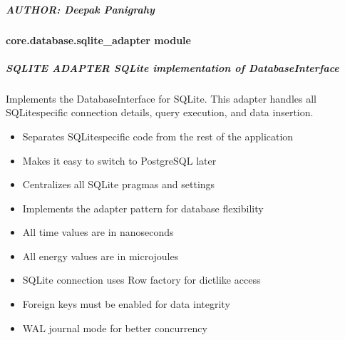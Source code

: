 \documentclass[letterpaper,10pt,english]{sphinxmanual}
\begin{document}
\subparagraph{AUTHOR: Deepak Panigrahy}
\label{\detokenize{core.database.schema:author-deepak-panigrahy}}
\sphinxstepscope


\paragraph{core.database.sqlite\_adapter module}
\label{\detokenize{core.database.sqlite_adapter:module-core.database.sqlite_adapter}}\label{\detokenize{core.database.sqlite_adapter:core-database-sqlite-adapter-module}}\label{\detokenize{core.database.sqlite_adapter::doc}}

\subparagraph{SQLITE ADAPTER \textendash{} SQLite implementation of DatabaseInterface}
\label{\detokenize{core.database.sqlite_adapter:sqlite-adapter-sqlite-implementation-of-databaseinterface}}\begin{description}
\sphinxAtStartPar
Implements the DatabaseInterface for SQLite. This adapter handles all
SQLite\sphinxhyphen{}specific connection details, query execution, and data insertion.

\begin{itemize}
\item {} 
\sphinxAtStartPar
Separates SQLite\sphinxhyphen{}specific code from the rest of the application

\item {} 
\sphinxAtStartPar
Makes it easy to switch to PostgreSQL later

\item {} 
\sphinxAtStartPar
Centralizes all SQLite pragmas and settings

\item {} 
\sphinxAtStartPar
Implements the adapter pattern for database flexibility

\end{itemize}

\begin{itemize}
\item {} 
\sphinxAtStartPar
All time values are in nanoseconds

\item {} 
\sphinxAtStartPar
All energy values are in microjoules

\item {} 
\sphinxAtStartPar
SQLite connection uses Row factory for dict\sphinxhyphen{}like access

\item {} 
\sphinxAtStartPar
Foreign keys must be enabled for data integrity

\item {} 
\sphinxAtStartPar
WAL journal mode for better concurrency

\end{itemize}

\end{description}
\end{document}
